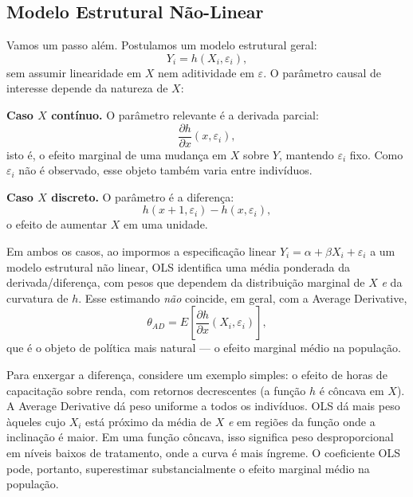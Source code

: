 \subsection{Modelo Estrutural Não-Linear}
\label{subsubsec:nao-linear}

Vamos um passo além. Postulamos um modelo estrutural geral:
\begin{equation}
Y_i = h(X_i, \varepsilon_i),
\label{eq:estrutural}
\end{equation}
sem assumir linearidade em $X$ nem aditividade em $\varepsilon$. O parâmetro causal de interesse depende da natureza de $X$:

\textbf{Caso $X$ contínuo.} O parâmetro relevante é a derivada parcial:
\begin{equation}
\frac{\partial h}{\partial x}(x, \varepsilon_i),
\label{eq:derivada-parcial}
\end{equation}
isto é, o efeito marginal de uma mudança em $X$ sobre $Y$, mantendo $\varepsilon_i$ fixo. Como $\varepsilon_i$ não é observado, esse objeto também varia entre indivíduos.

\textbf{Caso $X$ discreto.} O parâmetro é a diferença:
\begin{equation}
h(x+1, \varepsilon_i) - h(x, \varepsilon_i),
\label{eq:diferenca-discreta}
\end{equation}
o efeito de aumentar $X$ em uma unidade.

Em ambos os casos, ao impormos a especificação linear $Y_i = \alpha + \beta X_i + \varepsilon_i$ a um modelo estrutural não linear, OLS identifica uma média ponderada da derivada/diferença, com pesos que dependem da distribuição marginal de $X$ \textit{e} da curvatura de $h$. Esse estimando \textit{não} coincide, em geral, com a Average Derivative,
\begin{equation}
\theta_{AD} = E\left[\frac{\partial h}{\partial x}(X_i, \varepsilon_i)\right],
\label{eq:average-derivative}
\end{equation}
que é o objeto de política mais natural --- o efeito marginal médio na população.

Para enxergar a diferença, considere um exemplo simples: o efeito de horas de capacitação sobre renda, com retornos decrescentes (a função $h$ é côncava em $X$). A Average Derivative dá peso uniforme a todos os indivíduos. OLS dá mais peso àqueles cujo $X_i$ está próximo da média de $X$ \textit{e} em regiões da função onde a inclinação é maior. Em uma função côncava, isso significa peso desproporcional em níveis baixos de tratamento, onde a curva é mais íngreme. O coeficiente OLS pode, portanto, superestimar substancialmente o efeito marginal médio na população.

